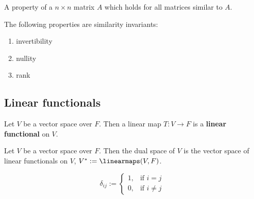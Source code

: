 \begin{definition}
  A property of a $n \times n$ matrix $A$ which holds for all matrices similar to $A$.
\end{definition}

\begin{theorem}
  The following properties are similarity invariants:
  \begin{enumerate}
    \item invertibility
    \item nullity
    \item rank
  \end{enumerate}
\end{theorem}

\subsection{Linear functionals}

\begin{definition}
  Let $V$ be a vector space over $F$. Then a linear map $T : V \to F$ is a \textbf{linear functional} on $V$.
\end{definition}

\begin{definition}
  Let $V$ be a vector space over $F$. Then the dual space of $V$ is the vector space of linear functionals on $V$, $V^* := \linearmaps(V, F)$.
\end{definition}

\begin{definition}
  \[
    \delta_{ij} := \begin{cases}
      1, & \text{if $i = j$} \\
      0, & \text{if $i \neq j$}
    \end{cases}
  \]
\end{definition}

